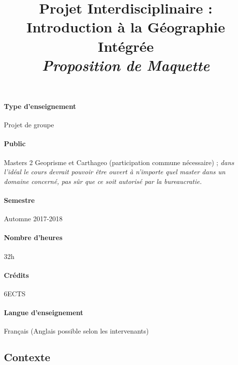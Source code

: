 \documentclass[11pt]{article}
\title{Projet Interdisciplinaire : Introduction à la Géographie Intégrée\\\medskip
\textit{Proposition de Maquette}
}
\author{}
\date{}
\begin{document}
\maketitle

%



\paragraph{Type d'enseignement} 

Projet de groupe

\paragraph{Public}

Masters 2 Geoprisme et Carthageo (participation commune nécessaire) ; \textit{dans l'idéal le cours devrait pouvoir être ouvert à n'importe quel master dans un domaine concerné, pas sûr que ce soit autorisé par la bureaucratie.}

\paragraph{Semestre}

Automne 2017-2018

\paragraph{Nombre d'heures}

32h

\paragraph{Crédits}

6ECTS

\paragraph{Langue d'enseignement}

Français (Anglais possible selon les intervenants)


\justify

\subsection*{Contexte}
\end{document}
